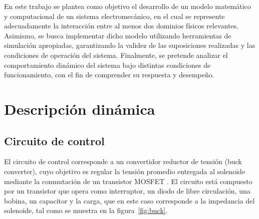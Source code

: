 \documentclass[journal]{IEEEtran}
\begin{document}
En este trabajo se plantea como objetivo el desarrollo de un modelo matemático y computacional de un sistema electromecánico, en el cual se represente adecuadamente la interacción entre al menos dos dominios físicos relevantes. Asimismo, se busca implementar dicho modelo utilizando herramientas de simulación apropiadas, garantizando la validez de las suposiciones realizadas y las condiciones de operación del sistema. Finalmente, se pretende analizar el comportamiento dinámico del sistema bajo distintas condiciones de funcionamiento, con el fin de comprender su respuesta y desempeño.

\section{Descripción dinámica}

\subsection{Circuito de control}

El circuito de control corresponde a un convertidor reductor de tensión 
(buck converter), cuyo objetivo es regular la tensión promedio entregada 
al solenoide mediante la conmutación de un transistor MOSFET \cite{hart2011}. 
El circuito está compuesto por un transistor que opera como interruptor, 
un diodo de libre circulación, una bobina, un capacitor y la carga, que 
en este caso corresponde a la impedancia del solenoide, tal como se 
muestra en la figura~\ref{fig:buck}.
\end{document}
